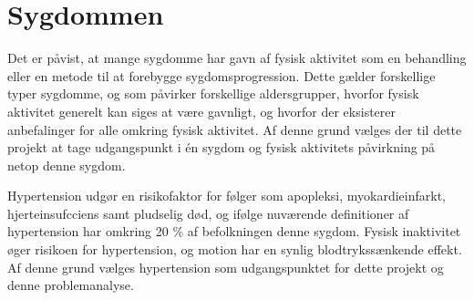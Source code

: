 \section{Sygdommen}
Det er påvist, at mange sygdomme har gavn af fysisk aktivitet som en behandling eller en metode til at forebygge sygdomsprogression. \citep{motionsraad2007,pedersen2011} Dette gælder forskellige typer sygdomme, og som påvirker forskellige aldersgrupper, hvorfor fysisk aktivitet generelt kan siges at være gavnligt, og hvorfor der eksisterer anbefalinger for alle omkring fysisk aktivitet. \citep{pedersen2011} Af denne grund vælges der til dette projekt at tage udgangspunkt i én sygdom og fysisk aktivitets påvirkning på netop denne sygdom.

Hypertension udgør en risikofaktor for følger som apopleksi, myokardieinfarkt, hjerteinsufcciens samt pludselig død, og ifølge nuværende definitioner af hypertension har omkring 20 \% af befolkningen denne sygdom. \citep{pedersen2011} Fysisk inaktivitet øger risikoen for hypertension, og motion har en synlig blodtrykssænkende effekt. \citep{olsen2015} Af denne grund vælges hypertension som udgangspunktet for dette projekt og denne problemanalyse. 